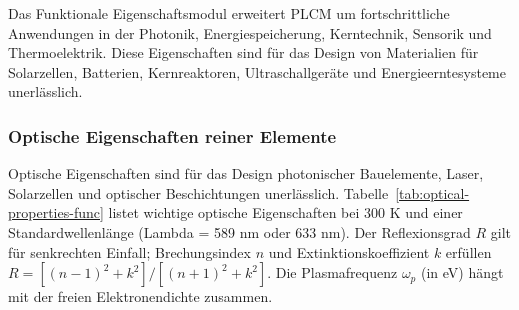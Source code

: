 \documentclass[12pt,a4paper]{article}
\begin{document}
	Das Funktionale Eigenschaftsmodul erweitert PLCM um fortschrittliche Anwendungen in der Photonik, Energiespeicherung, Kerntechnik, Sensorik und Thermoelektrik. Diese Eigenschaften sind für das Design von Materialien für Solarzellen, Batterien, Kernreaktoren, Ultraschallgeräte und Energieerntesysteme unerlässlich.
	
	\subsubsection{Optische Eigenschaften reiner Elemente}
	\label{subsec:optical-properties}
	
	Optische Eigenschaften sind für das Design photonischer Bauelemente, Laser, Solarzellen und optischer Beschichtungen unerlässlich. Tabelle~\ref{tab:optical-properties-func} listet wichtige optische Eigenschaften bei 300 K und einer Standardwellenlänge (Lambda = 589 nm oder 633 nm). Der Reflexionsgrad \(R\) gilt für senkrechten Einfall; Brechungsindex \(n\) und Extinktionskoeffizient \(k\) erfüllen \(R = [(n-1)^2 + k^2]/[(n+1)^2 + k^2]\). Die Plasmafrequenz \(\omega_p\) (in eV) hängt mit der freien Elektronendichte zusammen.
	
\end{document}

